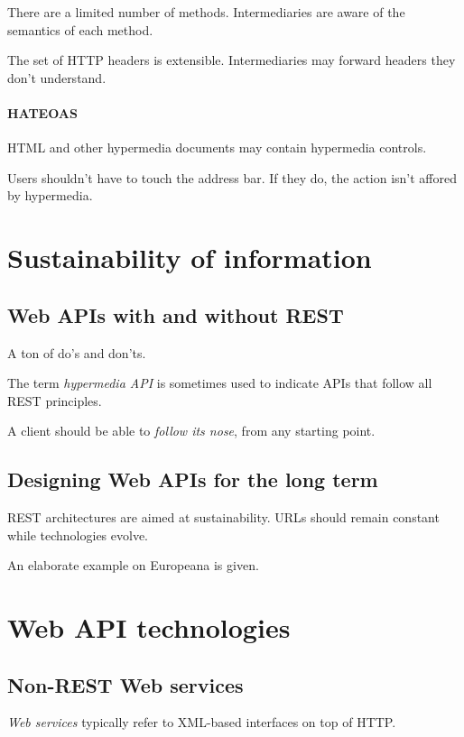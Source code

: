 \documentclass{report}
\begin{document}
There are a limited number of methods.
Intermediaries are aware of the semantics of each method.

The set of HTTP headers is extensible.
Intermediaries may forward headers they don't understand.

\paragraph{HATEOAS} 

HTML and other hypermedia documents
may contain hypermedia controls.

Users shouldn't have to touch the address bar.
If they do, the action isn't affored by hypermedia.

\section{Sustainability of information}

\subsection{Web APIs with and without REST}

A ton of do's and don'ts.

The term \emph{hypermedia API} is sometimes used
to indicate APIs that follow all REST principles.

A client should be able to \emph{follow its nose},
from any starting point.

\subsection{Designing Web APIs for the long term}

REST architectures are aimed at sustainability.
URLs should remain constant while technologies evolve.

An elaborate example on Europeana is given.

\section{Web API technologies}

\subsection{Non-REST Web services}

\emph{Web services} typically refer to XML-based interfaces
on top of HTTP.
\end{document}
